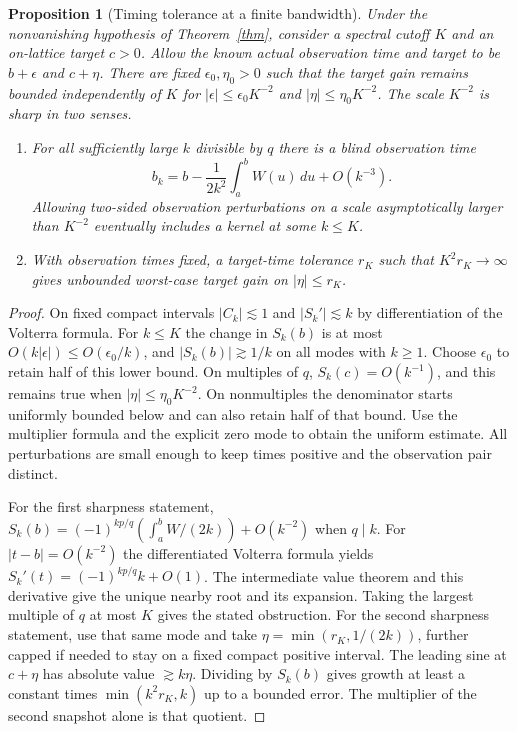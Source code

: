 \documentclass[11pt]{article}
\newtheorem{proposition}{Proposition}
\begin{document}
\begin{proposition}[Timing tolerance at a finite bandwidth]
Under the nonvanishing hypothesis of Theorem~\ref{thm}, consider a
spectral cutoff $K$ and an on-lattice target $c>0$. Allow the known
actual observation time and target to be $b+\epsilon$ and $c+\eta$.
There are fixed $\epsilon_0,\eta_0>0$ such that the target gain remains
bounded independently of $K$ for $|\epsilon|\le\epsilon_0 K^{-2}$
and $|\eta|\le\eta_0 K^{-2}$.
The scale $K^{-2}$ is sharp in two senses.
\begin{enumerate}
\item For all sufficiently large $k$ divisible by $q$ there is a blind
observation time
\[
 b_k=b-\frac{1}{2k^2}\int_a^b W(u)\,du+O(k^{-3}).
\]
Allowing two-sided observation perturbations on a scale asymptotically
larger than $K^{-2}$ eventually includes a kernel at some $k\le K$.
\item With observation times fixed, a target-time tolerance $r_K$
such that $K^2r_K\to\infty$ gives unbounded worst-case target gain on
$|\eta|\le r_K$.
\end{enumerate}
\end{proposition}
\begin{proof}
On fixed compact intervals $|C_k|\lesssim1$ and
$|S_k'|\lesssim k$ by differentiation of the Volterra formula.
For $k\le K$ the change in $S_k(b)$ is at most
$O(k|\epsilon|)\le O(\epsilon_0/k)$, and
$|S_k(b)|\gtrsim1/k$ on all modes with $k\ge1$.
Choose $\epsilon_0$ to retain half of this lower bound.
On multiples of $q$, $S_k(c)=O(k^{-1})$, and this remains true
when $|\eta|\le\eta_0K^{-2}$. On nonmultiples the denominator
starts uniformly bounded below and can also retain half of that bound.
Use the multiplier formula and the explicit zero mode to obtain
the uniform estimate. All perturbations are small enough to keep
times positive and the observation pair distinct.

For the first sharpness statement, $S_k(b)=(-1)^{kp/q}
(\int_a^b W/(2k))+O(k^{-2})$ when $q\mid k$.
For $|t-b|=O(k^{-2})$ the differentiated Volterra formula yields
$S_k'(t)=(-1)^{kp/q} k+O(1)$. The intermediate value theorem
and this derivative give the unique nearby root and its expansion.
Taking the largest multiple of $q$ at most $K$ gives the stated
obstruction. For the second sharpness statement, use that same mode
and take $\eta=\min(r_K,1/(2k))$, further capped if needed to stay
on a fixed compact positive interval. The leading sine at $c+\eta$
has absolute value $\gtrsim k\eta$. Dividing by $S_k(b)$ gives
growth at least a constant times $\min(k^2 r_K,k)$ up to a bounded
error. The multiplier of the second snapshot alone is that quotient.
\end{proof}
\end{document}
